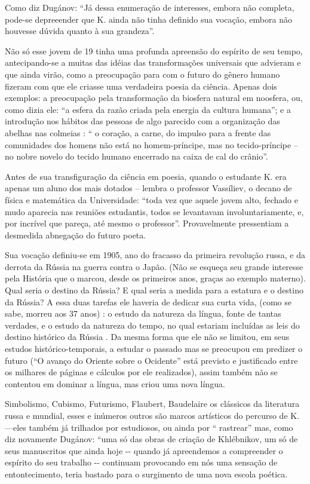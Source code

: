 Como diz Dugánov: ``Já dessa enumeração de interesses, embora não
completa, pode-se depreeender que K. ainda não tinha definido sua
vocação, embora não houvesse dúvida quanto à sua grandeza''.

Não só esse jovem de 19 tinha uma profunda apreensão do espírito de seu
tempo, antecipando-se a muitas das idéias das transformações universais
que advieram e que ainda virão, como a preocupação para com o futuro do
gênero humano fizeram com que ele criasse uma verdadeira poesia da
ciência. Apenas dois exemplos: a preocupação pela transformação da
biosfera natural em noosfera, ou, como dizia ele: ``a esfera da razão
criada pela energia da cultura humana''; e a introdução nos hábitos das
pessoas de algo parecido com a organização das abelhas nas colmeias : ``
o coração, a carne, do impulso para a frente das comunidades dos homens
não está no homem-príncipe, mas no tecido-príncipe -- no nobre novelo do
tecido humano encerrado na caixa de cal do crânio''.

Antes de sua transfiguração da ciência em poesia, quando o estudante K.
era apenas um aluno dos mais dotados -- lembra o professor Vassíliev, o
decano de física e matemática da Universidade: ``toda vez que aquele
jovem alto, fechado e mudo aparecia nas reuniões estudantis, todos se
levantavam involuntariamente, e, por incrível que pareça, até mesmo o
professor''. Provavelmente pressentiam a desmedida abnegação do futuro
poeta.

Sua vocação definiu-se em 1905, ano do fracasso da primeira revolução
russa, e da derrota da Rússia na guerra contra o Japão. (Não se esqueça
seu grande interesse pela História que o marcou, desde os primeiros
anos, graças ao exemplo materno). Qual seria o destino da Rússia? E qual
seria a medida para a estatura e o destino da Rússia? A essa duas
tarefas ele haveria de dedicar sua curta vida, (como se sabe, morreu aos
37 anos) : o estudo da natureza da língua, fonte de tantas verdades, e o
estudo da natureza do tempo, no qual estariam incluídas as leis do
destino histórico da Rússia . Da mesma forma que ele não se limitou, em
seus estudos histórico-temporais, a estudar o passado mas se preocupou
em predizer o futuro (``O avanço do Oriente sobre o Ocidente'' está
previsto e justificado entre os milhares de páginas e cálculos por ele
realizados), assim também não se contentou em dominar a língua, mas
criou uma nova língua.

Simbolismo, Cubismo, Futurismo, Flaubert, Baudelaire os clássicos da
literatura russa e mundial, esses e inúmeros outros são marcos
artísticos do percurso de K.---eles também já trilhados por estudiosos,
ou ainda por `` rastrear'' mas, como diz novamente Dugánov: ``uma só das
obras de criação de Khlébnikov, um só de seus manuscritos que ainda hoje
-\/- quando já apreendemos a compreender o espírito do seu trabalho -\/-
continuam provocando em nós uma sensação de entontecimento, teria
bastado para o surgimento de uma nova escola poética.

